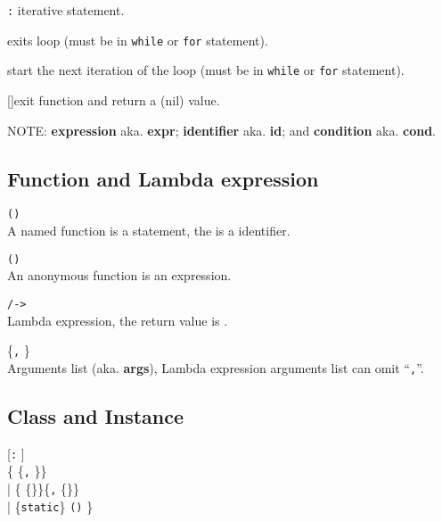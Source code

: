 \hangpar {}  

\hangpar {}   

\hangpar {}  \texttt{:}   \quad iterative statement.

\hangpar {}\quad exits loop (must be in \texttt{while} or \texttt{for} statement).

\hangpar {}\quad start the next iteration of the loop (must be in \texttt{while} or \texttt{for} statement).

\hangpar {} []\quad exit function and return a (nil) value.

\hangpar \textsf{NOTE}: \textbf{expression} aka. \textbf{expr}; \textbf{identifier} aka. \textbf{id}; and \textbf{condition} aka. \textbf{cond}.

\subsection*{Function and Lambda expression}

\hangpar {}  \texttt{(}\texttt{)}   \\
A named function is a statement, the  is a identifier.

\hangpar {} \texttt{(}\texttt{)}   \\
An anonymous function is an expression.

\hangpar \texttt{/}\texttt{->} \\
Lambda expression, the return value is .

\hangpar {} \{\texttt{,} \}\\
Arguments list (aka. \textbf{args}), Lambda expression arguments list can omit ``\texttt{,}''.

\subsection*{Class and Instance}
\hangpar {}  [\texttt{:} ]\\
\{ \{\texttt{,} \}\}\\
    | \{ \{\texttb{=}\}\}\{\texttt{,} \{\texttb{=}\}\}\\
    | \hangpar \{\texttt{static}\}   \texttt{(}\texttt{)}  \}

